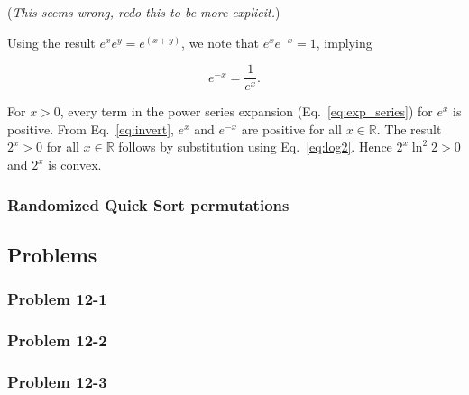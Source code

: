 \documentclass{article}
\begin{document}
(\textit{This seems wrong, redo this to be more explicit.})

Using the result $e^xe^y = e^{(x+y)}$, we note that $e^xe^{-x} = 1$, implying

\begin{equation}\label{eq:invert}
  e^{-x} = \frac{1}{e^x}.
\end{equation}

For $x > 0$, every term in the power series expansion
(Eq.~\ref{eq:exp_series}) for $e^x$ is positive.
From Eq.~\ref{eq:invert}, $e^x$ and $e^{-x}$ are positive for all $x\in\mathbb{R}$. The result
$2^x > 0$ for all $x\in\mathbb{R}$ follows by substitution using
Eq.~\ref{eq:log2}. Hence $2^x\ln^2 2 > 0$ and $2^x$ is convex.

\begin{comment}
Substituting and expanding:

\begin{equation}
  2^x = 1 + x\ln 2 + \frac{x^2 \ln^2 2}{2!} + \frac{x^3 \ln^3 2}{3!} + \cdots.
\end{equation}

For $x > 0, 2^x$ is clearly positive. For $x = 0, 2^0 = 1$, again positive. When $x < 0$,

\begin{equation}
  2^{-x} = 1 - x\ln 2 + \frac{x^2 \ln^2 2}{2!} - \frac{x^3 \ln^3 2}{3!} + \frac{x^4 \ln^4 2}{4!}
  - \frac{x^5 \ln^5 2}{5!} + \cdots.
\end{equation}
\end{comment}

\subsubsection{Randomized Quick Sort permutations}

\subsection{Problems}

\subsubsection{Problem 12-1}

\subsubsection{Problem 12-2}

\subsubsection{Problem 12-3}
\end{document}
